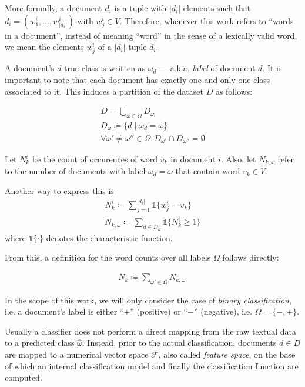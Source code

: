 More formally, a document $d_i$ is a tuple with $|d_i|$ elements such that
$d_i = (w_1^i,\ldots,w_{|d_i|}^i)$ with $w_j^i \in V$.
Therefore, whenever this work refers to ``words in a document'', instead of
meaning ``word'' in the sense of a lexically valid word, we mean the elements
$w_j^i$ of a $|d_i|$-tuple $d_i$.

A document's $d$ true class is written as $\omega_{d}$ ---  a.k.a.
\emph{label} of document $d$. It is important to note that each document has exactly one and
only one class associated to it. This induces a partition of the dataset $D$ as follows:

\begin{eqnarray*}
 D = \bigcup\limits_{\omega \in \Omega} D_\omega \\
 D_\omega \coloneqq  \{ d \mid \omega_d = \omega\} \\
\forall \omega' \neq \omega'' \in \Omega: D_{\omega'} \cap D_{\omega''} =
 \emptyset 
\end{eqnarray*}
 
Let $N_k^i$ be the count of occurences of word $v_k$ in document $i$. Also, let
$N_{k,\omega}$ refer to the number of documents with label $\omega_d = \omega$ 
that contain word $v_k \in V$.

Another way to express this is
\begin{eqnarray*}
 N_k^i \coloneqq \sum\limits_{j=1}^{|d_i|} \mathbb{1}\{w_j^i = v_k\} \\
 N_{k,\omega} \coloneqq \sum\limits_{d \in D_\omega} \mathbb{1}\{N^i_k \geq 1\} 
\end{eqnarray*}
where $\mathbb{1}\{\cdot\}$ denotes the characteristic function.

From this, a definition for the word counts over all labels $\Omega$ follows
directly:

\begin{eqnarray*}
N_k \coloneqq \sum_{\omega'\in \Omega} N_{k,\omega'} 
\end{eqnarray*}

In the scope of this work, we will only consider the case of \emph{binary
classification}, i.e. a document's label is either ``$+$'' (positive) or
``$-$'' (negative), i.e.  $\Omega = \{-,+\}$.

Usually a classifier does not perform a direct mapping from
the raw textual data to a predicted class $\hat{\omega}$. Instead, prior to the actual
classification, documents $d \in D$ are mapped to a numerical vector
space $\mathcal{F}$, also called \emph{feature space}, on the base of which an internal 
classification model and finally the classification function are computed.

